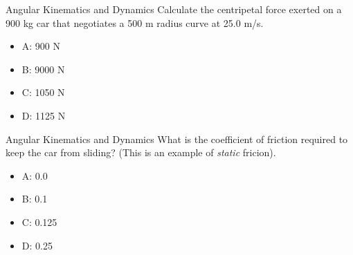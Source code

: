 \documentclass{beamer}
\begin{document}
\begin{frame}{Angular Kinematics and Dynamics}
Calculate the centripetal force exerted on a 900 kg car that negotiates a 500 m radius curve at 25.0 m/s.
\begin{itemize}
\item A: 900 N
\item B: 9000 N
\item C: 1050 N
\item D: 1125 N
\end{itemize}
\end{frame}

\begin{frame}{Angular Kinematics and Dynamics}
What is the coefficient of friction required to keep the car from sliding?  (This is an example of \textit{static} fricion).
\begin{itemize}
\item A: 0.0
\item B: 0.1
\item C: 0.125
\item D: 0.25
\end{itemize}
\end{frame}
\end{document}
